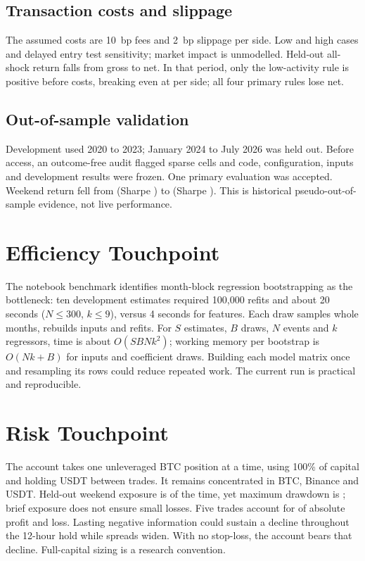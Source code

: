\documentclass[11pt,a4paper]{article}
\begin{document}
\subsection{Transaction costs and slippage}

The assumed costs are 10~bp fees and 2~bp slippage per side. Low and high cases and delayed entry test sensitivity; market impact is unmodelled. Held-out all-shock return falls from \HoAllGross{} gross to \HoAllNet{} net. In that period, only the low-activity rule is positive before costs, breaking even at \HoLowBreakEven{} per side; all four primary rules lose net.

\subsection{Out-of-sample validation}

Development used 2020 to 2023; January 2024 to July 2026 was held out. Before access, an outcome-free audit flagged sparse cells and code, configuration, inputs and development results were frozen. One primary evaluation was accepted. Weekend return fell from \DevWeekendNet{} (Sharpe \DevWeekendSharpe{}) to \HoWeekendNet{} (Sharpe \HoWeekendSharpe{}). This is historical pseudo-out-of-sample evidence, not live performance.

\section{Efficiency Touchpoint}

The notebook benchmark identifies month-block regression bootstrapping as the bottleneck: ten development estimates required 100,000 refits and about 20 seconds ($N\le300$, $k\le9$), versus 4 seconds for features. Each draw samples whole months, rebuilds inputs and refits. For $S$ estimates, $B$ draws, $N$ events and $k$ regressors, time is about $O(SBNk^2)$; working memory per bootstrap is $O(Nk+B)$ for inputs and coefficient draws. Building each model matrix once and resampling its rows could reduce repeated work. The current run is practical and reproducible.

\section{Risk Touchpoint}

The account takes one unleveraged BTC position at a time, using 100\% of capital and holding USDT between trades. It remains concentrated in BTC, Binance and USDT. Held-out weekend exposure is \HoWeekendInvested{} of the time, yet maximum drawdown is \HoWeekendDrawdown{}; brief exposure does not ensure small losses. Five trades account for \HoWeekendTopFiveShare{} of absolute profit and loss. Lasting negative information could sustain a decline throughout the 12-hour hold while spreads widen. With no stop-loss, the account bears that decline. Full-capital sizing is a research convention.
\end{document}
